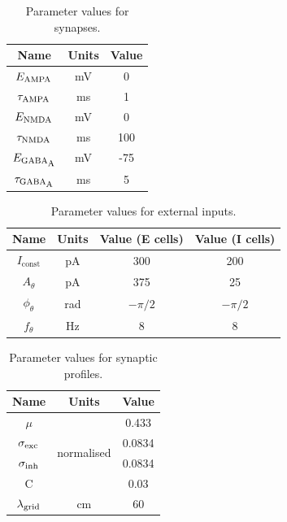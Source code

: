 \documentclass[a4paper,12pt]{article}
\newcommand{\ssc}[3]{\ensuremath{#1_{\text{#2}_{\text{#3}}}}}
\newcommand{\Iconst}   {\ssc{I}      {const} {}}
\newcommand{\Atheta}   {\ssc{A}      {$\theta$}{}}
\newcommand{\ftheta}   {\ssc{f}      {$\theta$}{}}
\newcommand{\phitheta} {\ssc{\phi}   {$\theta$}{}}
\newcommand{\EGABAA}   {\ssc{E}      {\scriptsize{GABA}}{\scriptsize{A}}}
\newcommand{\tauGABAA} {\ssc{\tau}   {\scriptsize{GABA}}{\scriptsize{A}}}
\newcommand{\EAMPA}    {\ssc{E}      {\scriptsize{AMPA}}{}}
\newcommand{\tauAMPA}  {\ssc{\tau}   {\scriptsize{AMPA}}{}}
\newcommand{\ENMDA}    {\ssc{E}      {\scriptsize{NMDA}}{}}
\newcommand{\tauNMDA}  {\ssc{\tau}   {\scriptsize{NMDA}}{}}
\newcommand{\sigmasub}[1]{\ssc{\sigma}{\scriptsize{#1}}{}}
\newcommand{\lamgrid}{\ssc{\lambda}{\scriptsize{grid}}{}}
\begin{document}
\begin{table}
    \internallinenumbers
    \centering
    \begin{tabular}{| c | c | c |}
        \hline
        Name       & Units & Value \\
        \hline\hline
        $\EAMPA$   & mV    & 0     \\
        $\tauAMPA$ & ms    & 1     \\
        $\ENMDA$   & mV    & 0     \\
        $\tauNMDA$ & ms    & 100   \\
        $\EGABAA$  & mV    & -75   \\
        $\tauGABAA$& ms    & 5     \\
        \hline
    \end{tabular}
    \caption{Parameter values for synapses.}
    \label{tab:params_synapses}
\end{table}

\begin{table}
    \internallinenumbers
    \centering
    \begin{tabular}{| c | c | c | c |}
        \hline
        Name       & Units & Value (E cells) & Value (I cells) \\
        \hline\hline
        $\Iconst$  & pA    & 300             & 200             \\
        $\Atheta$  & pA    & 375             & 25              \\
        $\phitheta$& rad   & $-\pi/2$        & $-\pi/2$        \\
        $\ftheta$  & Hz    & 8               & 8               \\
        \hline
    \end{tabular}
    \caption{Parameter values for external inputs.}
\end{table}

\begin{table}
    \internallinenumbers
    \centering
    \begin{tabular}{| c | c | c |}
        \hline
        Name              & Units                        & Value   \\
        \hline\hline
        $\mu$             & \multirow{4}{*}{normalised}  & 0.433   \\
        $\sigmasub{exc}$  &                              & 0.0834  \\
        $\sigmasub{inh}$  &                              & 0.0834  \\
        C                 &                              & 0.03    \\
        \lamgrid          & cm                           & 60      \\
        \hline
    \end{tabular}
    \caption{Parameter values for synaptic profiles.}
    \label{tab:params_syn}
\end{table}
\end{document}
